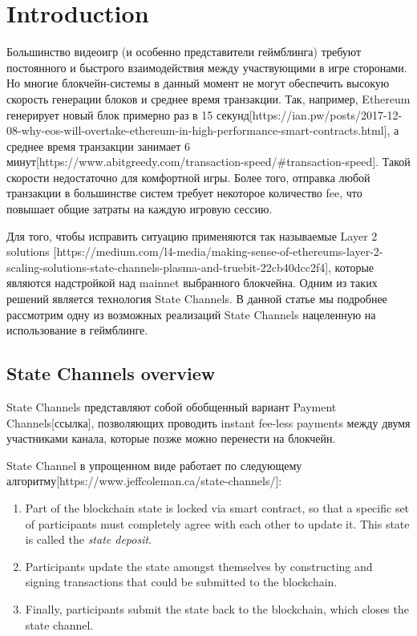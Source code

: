 \section{Introduction}
	Большинство видеоигр (и особенно представители геймблинга)  требуют постоянного и быстрого взаимодействия между участвующими в игре сторонами. Но многие блокчейн-системы в данный момент не могут обеспечить высокую скорость генерации блоков и среднее время транзакции. Так, например, Ethereum генерирует новый блок примерно раз в 15 секунд[https://ian.pw/posts/2017-12-08-why-eos-will-overtake-ethereum-in-high-performance-smart-contracts.html], а среднее время транзакции занимает 6 минут[https://www.abitgreedy.com/transaction-speed/\#transaction-speed]. Такой скорости  недостаточно для комфортной игры. Более того, отправка любой транзакции в большинстве систем требует некоторое количество fee, что повышает общие затраты на каждую игровую сессию.

	Для того, чтобы исправить ситуацию применяются так называемые Layer 2 solutions [https://medium.com/l4-media/making-sense-of-ethereums-layer-2-scaling-solutions-state-channels-plasma-and-truebit-22cb40dcc2f4], которые являются надстройкой над mainnet выбранного блокчейна. Одним из таких решений является технология State Channels. В данной статье мы подробнее рассмотрим одну из возможных реализаций State Channels нацеленную на использование в геймблинге.

		\subsection {State Channels overview}
	State Channels представляют собой обобщенный вариант Payment Channels[ссылка], позволяющих проводить instant fee-less payments между двумя участниками канала, которые позже можно перенести на блокчейн.

	State Channel в упрощенном виде работает по следующему алгоритму[https://www.jeffcoleman.ca/state-channels/]:
	\begin{enumerate}
		\item Part of the blockchain state is locked via smart contract, so that a specific set of participants must completely agree with each other to update it. This state is called the \textit {state deposit}.
		\item Participants update the state amongst themselves by constructing and signing transactions that could be submitted to the blockchain.
		\item Finally, participants submit the state back to the blockchain, which closes the state channel.
	\end{enumerate}

